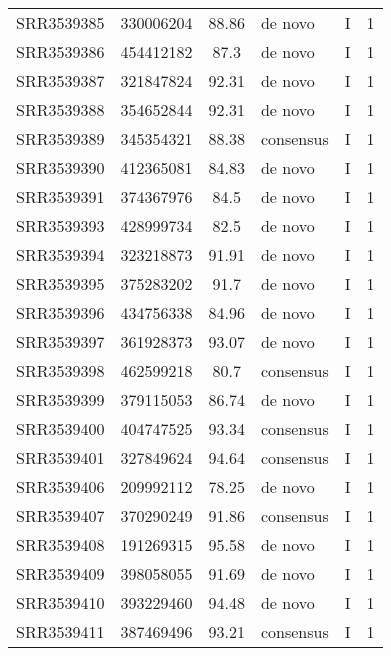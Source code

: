 \begin{scriptsize}
\begin{center}
\begin{longtable}{@{}lcclcc@{}}
SRR3539385 & 330006204     & 88.86       & de novo      & I        & 1        \\
SRR3539386 & 454412182     & 87.3        & de novo      & I        & 1        \\
SRR3539387 & 321847824     & 92.31       & de novo      & I        & 1        \\
SRR3539388 & 354652844     & 92.31       & de novo      & I        & 1        \\
SRR3539389 & 345354321     & 88.38       & consensus    & I        & 1        \\
SRR3539390 & 412365081     & 84.83       & de novo      & I        & 1        \\
SRR3539391 & 374367976     & 84.5        & de novo      & I        & 1        \\
SRR3539393 & 428999734     & 82.5        & de novo      & I        & 1        \\
SRR3539394 & 323218873     & 91.91       & de novo      & I        & 1        \\
SRR3539395 & 375283202     & 91.7        & de novo      & I        & 1        \\
SRR3539396 & 434756338     & 84.96       & de novo      & I        & 1        \\
SRR3539397 & 361928373     & 93.07       & de novo      & I        & 1        \\
SRR3539398 & 462599218     & 80.7        & consensus    & I        & 1        \\
SRR3539399 & 379115053     & 86.74       & de novo      & I        & 1        \\
SRR3539400 & 404747525     & 93.34       & consensus    & I        & 1        \\
SRR3539401 & 327849624     & 94.64       & consensus    & I        & 1        \\
SRR3539406 & 209992112     & 78.25       & de novo      & I        & 1        \\
SRR3539407 & 370290249     & 91.86       & consensus    & I        & 1        \\
SRR3539408 & 191269315     & 95.58       & de novo      & I        & 1        \\
SRR3539409 & 398058055     & 91.69       & de novo      & I        & 1        \\
SRR3539410 & 393229460     & 94.48       & de novo      & I        & 1        \\
SRR3539411 & 387469496     & 93.21       & consensus    & I        & 1        \\

\end{longtable}
\end{center}
\end{scriptsize}
